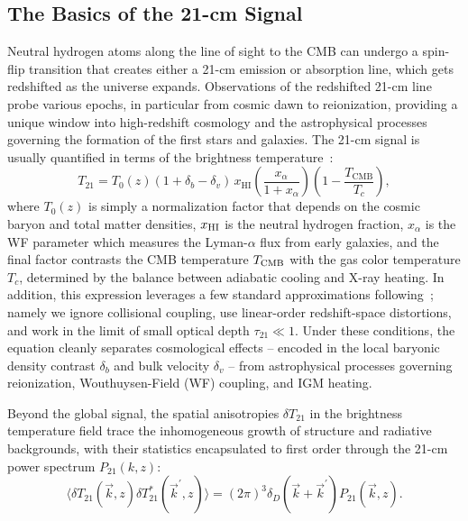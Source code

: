 \documentclass[floats,floatfix,showpacs,amssymb,prd,twocolumn,superscriptaddress,nofootinbib,reprint,preprintnumbers]{revtex4-2}
\begin{document}
\subsection{The Basics of the 21-cm Signal}
\noindent Neutral hydrogen atoms along the line of sight to the CMB can undergo a spin-flip transition that creates either a 21-cm emission or absorption line, which gets redshifted as the universe expands. Observations of the redshifted 21-cm line probe various epochs, in particular from cosmic dawn to reionization, providing a unique window into high-redshift cosmology and the astrophysical processes governing the formation of the first stars and galaxies. The 21-cm signal is usually quantified in terms of the brightness temperature~\citep{Furlanetto:2006jb}:
\begin{equation} \label{eq:T21}
    T_{21}=T_0(z)\left(1+\delta_b-\delta_v\right)\, x_{\mathrm{HI}}\left(\frac{x_\alpha}{1+x_\alpha}\right)\left(1-\frac{T_{\mathrm{CMB}}}{T_c}\right),
\end{equation}
where  $T_0(z)$ is simply a normalization factor that depends on the cosmic baryon and total matter densities, $x_{\rm HI}$ is the neutral hydrogen fraction, $x_\alpha$ is the WF parameter which measures the Lyman-$\alpha$ flux from early galaxies, and the final factor contrasts the CMB temperature $T_{\rm CMB}$ with the gas color temperature $T_c$, determined by the balance between adiabatic cooling and X-ray heating. In addition, this expression leverages a few standard approximations following~\citep{munoz23,munoz23b,Cruz:2024fsv}; namely we ignore collisional coupling, use linear-order redshift-space distortions, and work in the limit of small optical depth $\tau_{21} \ll 1$. Under these conditions, the equation cleanly separates cosmological effects -- encoded in the local baryonic density contrast $\delta_b$ and bulk velocity $\delta_v$ --
from astrophysical processes governing reionization, Wouthuysen-Field (WF) coupling, and IGM heating. 

Beyond the global signal, the spatial anisotropies $\delta T_{21}$ in the brightness temperature field trace the inhomogeneous growth of structure and radiative backgrounds, with their statistics encapsulated to first order through the 21-cm power spectrum $P_{21}(k, z)$:
\begin{equation}
    \langle \delta T_{21}(\vec{k}, z)\delta T^*_{21}(\vec{k}^\prime,z)\rangle= (2\pi)^3\delta_D(\vec{k} + \vec{k}^\prime) P_{21}(\vec{k}, z).
\end{equation}
\end{document}
